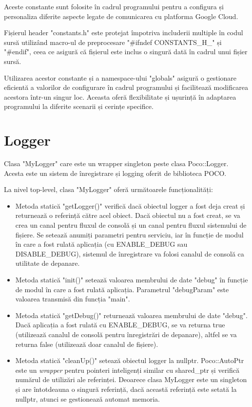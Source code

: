 Aceste constante sunt folosite în cadrul programului pentru a configura și personaliza diferite aspecte legate de comunicarea cu platforma Google Cloud.

Fișierul header "constants.h" este protejat împotriva includerii multiple în codul sursă utilizând macro-ul de preprocesare "\#ifndef CONSTANTS\_H\_" și "\#endif", ceea ce asigură că fișierul este inclus o singură dată în cadrul unui fișier sursă.

Utilizarea acestor constante și a namespace-ului "globals" asigură o gestionare eficientă a valorilor de configurare în cadrul programului și facilitează modificarea acestora într-un singur loc. Aceasta oferă flexibilitate și ușurință în adaptarea programului la diferite scenarii și cerințe specifice.

\section{Logger}

Clasa "MyLogger" care este un wrapper singleton peste clasa Poco::Logger. Acesta este un sistem de înregistrare și logging oferit de biblioteca POCO. 

La nivel top-level, clasa "MyLogger" oferă următoarele funcționalități:

\begin{itemize}
    \item Metoda statică "getLogger()" verifică dacă obiectul logger a fost deja creat și returnează o referință către acel obiect. Dacă obiectul nu a fost creat, se va crea un canal pentru fluxul de consolă și un canal pentru fluxul sistemului de fișiere. Se setează anumiți parametri pentru serviciu, iar în funcție de modul în care a fost rulată aplicația (cu ENABLE\_DEBUG sau DISABLE\_DEBUG), sistemul de înregistrare va folosi canalul de consolă ca utilitate de depanare.

    \item Metoda statică "init()" setează valoarea membrului de date "debug" în funcție de modul în care a fost rulată aplicația. Parametrul "debugParam" este valoarea transmisă din funcția "main".

    \item Metoda statică "getDebug()" returnează valoarea membrului de date "debug". Dacă aplicația a fost rulată cu ENABLE\_DEBUG, se va returna true (utilizează canalul de consolă pentru înregistrări de depanare), altfel se va returna false (utilizează doar canalul de fișiere).

    \item Metoda statică "cleanUp()" setează obiectul logger la nullptr. Poco::AutoPtr este un \emph{wrapper} pentru pointeri inteligenți similar cu shared\_ptr și verifică numărul de utilizări ale referinței. Deoarece clasa MyLogger este un singleton și are întotdeauna o singură referință, dacă această referință este setată la nullptr, atunci se gestionează automat memoria.
\end{itemize}

